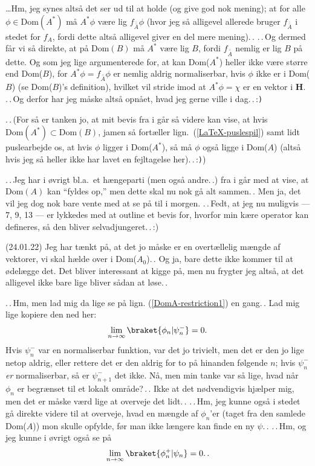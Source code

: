 \documentclass{report}
\begin{document}
\ldots Hm, jeg synes altså det ser ud til at holde (og give god nok mening); at for alle $\phi\in\mathrm{Dom}(A^*)$ må $A^*\phi$ være lig $f_{\bar{\bar{A}}} \phi$ (hvor jeg så alligevel allerede bruger $f_{\bar{\bar{A}}}$ i stedet for $f_A$, fordi dette altså alligevel giver en del mere mening).\,. .\,.\,Og dermed får vi så direkte, at på Dom$(B)$ må $A^*$ være lig $B$, fordi $f_{\bar{\bar{A}}}$ nemlig er lig $B$ på dette. Og som jeg lige argumenterede for, at kan Dom($A^*$) heller ikke være større end Dom($B$), for $A^*\phi = f_{\bar{\bar{A}}}\phi$ er nemlig aldrig normaliserbar, hvis $\phi$ ikke er i Dom($B$) (se Dom($B$)'s definition), hvilket vil stride imod at $A^*\phi = \chi$ er en vektor i \textbf{H}. .\,.\,Og derfor har jeg måske altså opnået, hvad jeg gerne ville i dag.\,.\,:\texttt{)} 

.\,.\,(For så er tanken jo, at mit bevis fra i går så videre kan vise, at hvis $\mathrm{Dom}(A^*) \subset \mathrm{Dom}(B)$, jamen så fortæller lign.\ (\ref{LaTeX-puslespil}) samt lidt puslearbejde os, at hvis $\phi$ ligger i Dom($A^*$), så må $\phi$ også ligge i Dom($A$) (altså hvis jeg så heller ikke har lavet en fejltagelse her).\,.\,:\texttt{)})

.\,.\,Jeg har i øvrigt bl.a.\ et hængeparti (men også andre.\,.) fra i går med at vise, at Dom$(A)$ kan ``fyldes op,'' men dette skal nu nok gå alt sammen.\,. Men ja, det vil jeg dog nok bare vente med at se på til i morgen. .\,.\,Fedt, at jeg nu muligvis --- 7, 9, 13 --- er lykkedes med at outline et bevis for, hvorfor min kære operator kan defineres, så den bliver selvadjungeret.\,.\,:) 


(24.01.22) Jeg har tænkt på, at det jo måske er en overtællelig mængde af vektorer, vi skal hælde over i Dom($A_0$).\,. Og ja, bare dette ikke kommer til at ødelægge det. Det bliver interessant at kigge på, men nu frygter jeg altså, at det alligevel ikke bare lige bliver sådan at løse.\,. 

.\,.\,Hm, men lad mig da lige se på lign. (\ref{DomA-restriction1}) en gang.\,. Lad mig lige kopiere den ned her:
\begin{align}
\begin{aligned}
	\lim_{n\to\infty}\braket{\phi_n| \psi_n^-} = 0.
\end{aligned}
\end{align}
Hvis $\psi_n^-$ var en normaliserbar funktion, var det jo trivielt, men det er den jo lige netop aldrig, eller rettere det er den aldrig for to på hinanden følgende $n$; hvis $\psi_n^-$ \emph{er} normaliserbar, så er $\psi_{n+1}^-$ det ikke. Nå, men min tanke var så lige, hvad når $\phi_n$ er begrænset til et lokalt område?\,.\,. Ikke at det nødvendigvis hjælper mig, men det er måske værd lige at overveje det lidt.\,. .\,.\,Hm, jeg kunne også i stedet gå direkte videre til at overveje, hvad en mængde af $\phi_n$'er (taget fra den samlede Dom($A$)) mon skulle opfylde, før man ikke længere kan finde en ny $\psi$.\,. .\,.\,Hm, og jeg kunne i øvrigt også se på
\begin{align}
\begin{aligned}
\lim_{n\to\infty}\braket{\phi_n^+| \psi_n} = 0.\,.
\end{aligned}
\end{align}
\end{document}
